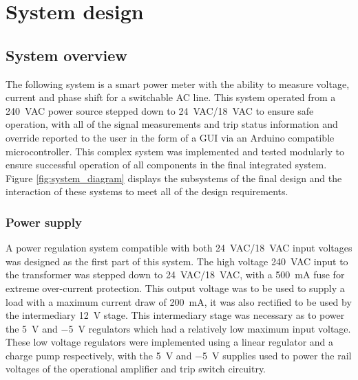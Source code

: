 
\chapter{System design}
\section{System overview} \label{sec:system}
The following system is a smart power meter with the ability to measure voltage, current and phase shift for a switchable AC line. This system operated from a \SI{240}{VAC} power source stepped down to \SI{24}{VAC}/\SI{18}{VAC} to ensure safe operation, with all of the signal measurements and trip status information and override reported to the user in the form of a GUI via an Arduino compatible microcontroller. This complex system was implemented and tested modularly to ensure successful operation of all components in the final integrated system. Figure \ref{fig:system_diagram} displays the subsystems of the final design and the interaction of these systems to meet all of the design requirements.

\subsection{Power supply}\label{subsec:power}
A power regulation system compatible with both \SI{24}{VAC}/\SI{18}{VAC} input voltages was designed as the first part of this system. The high voltage \SI{240}{VAC} input to the transformer was stepped down to \SI{24}{VAC}/\SI{18}{VAC}, with a \SI{500}{\milli A} fuse for extreme over-current protection. This output voltage was to be used to supply a load with a maximum current draw of \SI{200}{\milli A}, it was also rectified to be used by the intermediary \SI{12}{V} stage. This intermediary stage was necessary as to power the \SI{+5}{V} and \SI{-5}{V} regulators which had a relatively low maximum input voltage. These low voltage regulators were implemented using a linear regulator and a charge pump respectively, with the \SI{+5}{V} and \SI{-5}{V} supplies used to power the rail voltages of the operational amplifier and trip switch circuitry.

